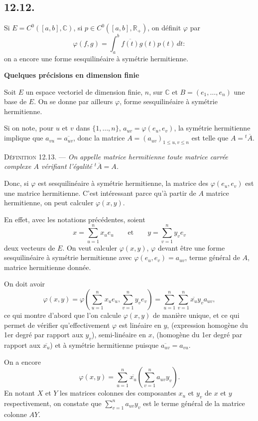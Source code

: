 \subsection*{12.12.}
Si $E=C^0([a,b],\mathbb C)$, si $p\in C^0([a,b],\mathbb R_+)$, on définit $\varphi$ par
\[
\varphi(f,g)=\int_a^b\overline{f(t)}g(t)p(t)\,dt :
\]
on a encore une forme sesquilinéaire à symétrie hermitienne.

\medskip\noindent\textbf{Quelques précisions en dimension finie}

Soit $E$ un espace vectoriel de dimension finie, $n$, sur $\mathbb C$ et $B=(e_1,\ldots,e_n)$ une base de $E$. On se donne par ailleurs $\varphi$, forme sesquilinéaire à symétrie hermitienne.

Si on note, pour $u$ et $v$ dans $\{1,\ldots,n\}$, $a_{uv}=\varphi(e_u,e_v)$, la symétrie hermitienne implique que $a_{vu}=\overline{a_{uv}}$, donc la matrice $A=(a_{uv})_{1\le u,v\le n}$ est telle que $A={}^t\!\overline A$.

\medskip\noindent\textsc{Définition 12.13.} --- \emph{On appelle matrice hermitienne toute matrice carrée complexe $A$ vérifiant l'égalité ${}^t\!\overline A=A$.}

Donc, si $\varphi$ est sesquilinéaire à symétrie hermitienne, la matrice des $\varphi(e_u,e_v)$ est une matrice hermitienne. C'est intéressant parce qu'à partir de $A$ matrice hermitienne, on peut calculer $\varphi(x,y)$.

En effet, avec les notations précédentes, soient
\[
x=\sum_{u=1}^n x_ue_u\qquad\text{et}\qquad y=\sum_{v=1}^n y_ve_v
\]
deux vecteurs de $E$. On veut calculer $\varphi(x,y)$, $\varphi$ devant être une forme sesquilinéaire à symétrie hermitienne avec $\varphi(e_u,e_v)=a_{uv}$, terme général de $A$, matrice hermitienne donnée.

On doit avoir
\[
\varphi(x,y)=\varphi\left(\sum_{u=1}^n x_ue_u,\sum_{v=1}^n y_ve_v\right)
=\sum_{u=1}^n\sum_{v=1}^n\overline{x_u}y_va_{uv},
\]
ce qui montre d'abord que l'on calcule $\varphi(x,y)$ de manière unique, et ce qui permet de vérifier qu'effectivement $\varphi$ est linéaire en $y$, (expression homogène du 1er degré par rapport aux $y_v$), semi-linéaire en $x$, (homogène du 1er degré par rapport aux $\overline{x_u}$) et à symétrie hermitienne puisque $\overline{a_{uv}}=a_{vu}$.

On a encore
\[
\varphi(x,y)=\sum_{u=1}^n\overline{x_u}\left(\sum_{v=1}^n a_{uv}y_v\right).
\]
En notant $X$ et $Y$ les matrices colonnes des composantes $x_u$ et $y_v$ de $x$ et $y$ respectivement, on constate que $\sum_{v=1}^n a_{uv}y_v$ est le terme général de la matrice colonne $AY$.

